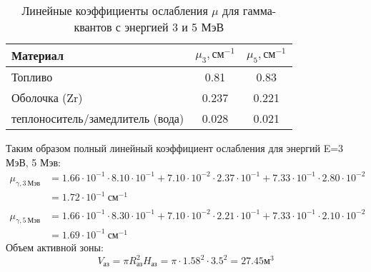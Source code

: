 \begin{table}[H]
	\caption{Линейные коэффициенты ослабления $\mu$ для гамма-квантов с энергией 3 и 5 МэВ}
	\begin{center}
        \begin{tabular}{|l|c|c|}
        \toprule
         Материал & $\mu_3, \text{см}^{-1}$ & $\mu_5, \text{см}^{-1}$ \\
         \midrule
         \hline
         Топливо & 0.81 & 0.83 \\
         \hline
         Оболочка (Zr) & 0.237 & 0.221\\
         \hline
         теплоноситель/замедлитель (вода) & 0.028 & 0.021\\
         \bottomrule
		\end{tabular}
		\label{tabular:koeff_oslab}
	\end{center}
\end{table}
\noindent Таким образом полный линейный коэффициент ослабления для энергий E=3 МэВ, 5 Мэв:
\begin{align*}
        \mu_{\gamma, 3\ \text{Мэв}} &= 1.66 \cdot 10^{{ -1 }}\cdot8.10 \cdot 10^{{ -1 }} + 7.10 \cdot 10^{{ -2 }}\cdot2.37 \cdot 10^{{ -1 }} + 7.33 \cdot 10^{{ -1 }}\cdot2.80 \cdot 10^{{ -2 }}\\ &= 1.72 \cdot 10^{{ -1 }}\ \text{см}^{-1} \\
\\
    \mu_{\gamma, 5\ \text{Мэв}} &= 1.66 \cdot 10^{{ -1 }}\cdot8.30 \cdot 10^{{ -1 }} + 7.10 \cdot 10^{{ -2 }}\cdot2.21 \cdot 10^{{ -1 }} + 7.33 \cdot 10^{{ -1 }}\cdot2.10 \cdot 10^{{ -2 }} \\&= 1.69 \cdot 10^{{ -1 }}\ \text{см}^{-1}
\end{align*}
\noindent Объем активной зоны:
$$
V_{\text{аз}} = \pi R_{\text{аз}}^2 H_{\text{аз}} = \pi \cdot 1.58 ^ 2 \cdot 3.5 ^ 2 = 27.45 \text{м}^3
$$

